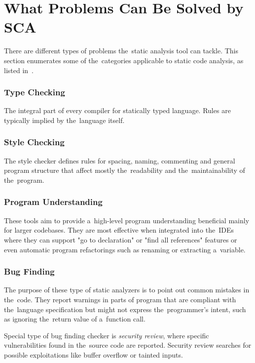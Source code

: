 \documentclass[
  digital, %
  table,   %
  lof,     %
  lot,     %
  oneside,
]{fithesis3}
\begin{document}
\section{What Problems Can Be Solved by SCA}
There are different types of problems the~static analysis tool can tackle. This section enumerates some of the~categories applicable to static code analysis, as listed in~\cite{secure-programming-sca}.

\subsubsection{\textbf{Type Checking}}
The integral part of every compiler for statically typed language. Rules are typically implied by the~language itself.

\subsubsection{\textbf{Style Checking}}
The style checker defines rules for spacing, naming, commenting and general program structure that affect mostly the~readability and the~maintainability of the~program. 

\subsubsection{\textbf{Program Understanding}}
These tools aim to provide a~high-level program understanding beneficial mainly for larger codebases. They are most effective when integrated into the~IDEs where they can support "go to declaration" or "find all references" features or even automatic program refactorings such as renaming or extracting a~variable.

\subsubsection{\textbf{Bug Finding}}
The  purpose of these type of static analyzers is to point out common mistakes in the~code. They report warnings in parts of program that are compliant with the~language specification but might not express the~programmer's intent, such as ignoring the~return value of a~function call.

Special type of bug finding checker is \textit{security review}, where specific vulnerabilities found in the~source code are reported. Security review searches for possible exploitations like buffer overflow or tainted inputs.
  
\end{document}
